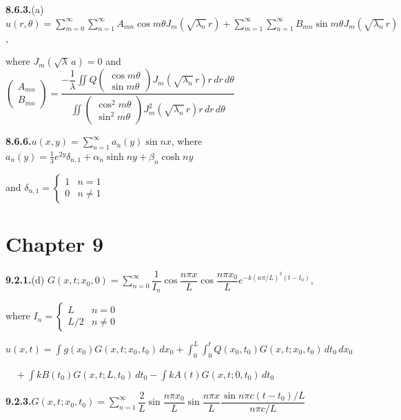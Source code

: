 \medskip
\textbf{8.6.3.}\quad (a) $u(r,\theta) = \sum_{m=0}^{\infty}\sum_{n=1}^{\infty}A_{mn}\cos m\theta J_m(\sqrt{\lambda_n}\,r) + \sum_{m=1}^{\infty}\sum_{n=1}^{\infty}B_{mn}\sin m\theta J_m(\sqrt{\lambda_n}\,r)$,

where $J_m(\sqrt{\lambda}\,a) = 0$ and $\begin{pmatrix}A_{mn}\\B_{mn}\end{pmatrix} = \dfrac{-\dfrac{1}{\lambda}\iint Q\begin{pmatrix}\cos m\theta\\\sin m\theta\end{pmatrix}J_m(\sqrt{\lambda_n}\,r)r\,dr\,d\theta}{\iint\begin{pmatrix}\cos^2 m\theta\\\sin^2 m\theta\end{pmatrix}J_m^2(\sqrt{\lambda_n}\,r)r\,dr\,d\theta}$

\medskip
\textbf{8.6.6.}\quad $u(x,y) = \sum_{n=1}^{\infty}a_n(y)\sin nx$, where $a_n(y) = \frac{1}{3}e^{2y}\delta_{n,1} + \alpha_n\sinh ny + \beta_n\cosh ny$

and $\delta_{n,1} = \begin{cases} 1 & n=1 \\ 0 & n \neq 1 \end{cases}$

\section*{Chapter 9}

\textbf{9.2.1.}\quad (d) $G(x,t;x_0,0) = \sum_{n=0}^{\infty}\dfrac{1}{I_n}\cos\dfrac{n\pi x}{L}\cos\dfrac{n\pi x_0}{L}e^{-k(n\pi/L)^2(t-t_0)}$,

where $I_n = \begin{cases} L & n=0 \\ L/2 & n\neq 0 \end{cases}$

$u(x,t) = \int g(x_0)G(x,t;x_0,t_0)\,dx_0 + \int_0^L\int_0^t Q(x_0,t_0)G(x,t;x_0,t_0)\,dt_0\,dx_0$

$\quad + \int kB(t_0)G(x,t;L,t_0)\,dt_0 - \int kA(t)G(x,t;0,t_0)\,dt_0$

\medskip
\textbf{9.2.3.}\quad $G(x,t;x_0,t_0) = \sum_{n=1}^{\infty}\dfrac{2}{L}\sin\dfrac{n\pi x_0}{L}\sin\dfrac{n\pi x}{L}\dfrac{\sin n\pi c(t-t_0)/L}{n\pi c/L}$

